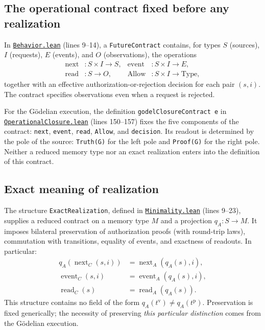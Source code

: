 \documentclass[11pt,a4paper]{article}
\newcommand{\code}[1]{\nolinkurl{#1}}
\newcommand{\SourceAt}[3]{\href{https://github.com/JohnDoe-collab-stack/relational-perimeter/blob/1e5aeda745559d62a3819bb3213da7fce3c31ad1/#1\#L#2}{\nolinkurl{#3}}}
\theoremstyle{remark}
\begin{document}
\subsection{The operational contract fixed before any realization}

In \SourceAt{RelationalPerimeter/Constitution/Continuation/Behavior.lean}{9-L14}{Behavior.lean}
(lines 9--14), a \code{FutureContract} contains, for types $S$ (sources),
$I$ (requests), $E$ (events), and $O$ (observations), the operations
\[
\begin{aligned}
\operatorname{next}&:S\times I\to S, &
\operatorname{event}&:S\times I\to E,\\
\operatorname{read}&:S\to O, &
\operatorname{Allow}&:S\times I\to\mathrm{Type},
\end{aligned}
\]
together with an effective authorization-or-rejection decision for each
pair $(s,i)$. The contract specifies observations even when a request is
rejected.

For the Gödelian execution, the definition \code{godelClosureContract e}
in \SourceAt{RelationalPerimeter/Constitution/Godel/OperationalClosure.lean}{150-L157}{OperationalClosure.lean}
(lines 150--157) fixes the five components of the contract: \code{next},
\code{event}, \code{read}, \code{Allow}, and \code{decision}. Its readout
is determined by the pole of the source: \code{Truth(G)} for the left pole
and \code{Proof(G)} for the right pole. Neither a reduced memory type nor an
exact realization enters into the definition of this contract.

\subsection{Exact meaning of realization}

The structure \code{ExactRealization}, defined in
\SourceAt{RelationalPerimeter/Constitution/Continuation/Minimality.lean}{9-L23}{Minimality.lean}
(lines 9--23), supplies a reduced contract on a memory type $M$ and a
projection $q_A:S\to M$. It imposes bilateral preservation of
authorization proofs (with round-trip laws), commutation with transitions,
equality of events, and exactness of readouts. In particular:
\begin{equation}\label{eq:exactness}
\begin{aligned}
q_A(\operatorname{next}_C(s,i))
  &=\operatorname{next}_{A}(q_A(s),i),\\
\operatorname{event}_C(s,i)
  &=\operatorname{event}_{A}(q_A(s),i),\\
\operatorname{read}_C(s)
  &=\operatorname{read}_{A}(q_A(s)).
\end{aligned}
\end{equation}
This structure contains no field of the form
$q_A(t^{\mathrm v})\neq q_A(t^{\mathrm p})$. Preservation is fixed
generically; the necessity of preserving \emph{this particular
distinction} comes from the Gödelian execution.
\end{document}
